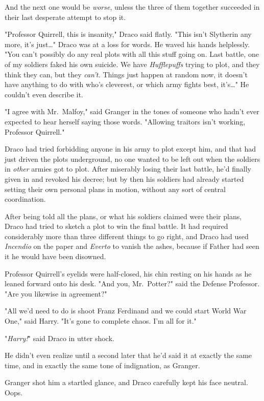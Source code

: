 And the next one would be \emph{worse}, unless the three of them together
succeeded in their last desperate attempt to stop it.

"Professor Quirrell, this is insanity," Draco said flatly. "This isn't
Slytherin any more, it's just{\ldots}" Draco was at a loss for words. He
waved his hands helplessly. "You can't possibly do any real plots with all this
stuff going on. Last battle, one of my soldiers faked his own suicide. We have
\emph{Hufflepuffs} trying to plot, and they think they can, but they
\emph{can't.} Things just happen at random now, it doesn't have anything to do
with who's cleverest, or which army fights best, it's{\ldots}" He couldn't even
describe it.

"I agree with Mr.~Malfoy," said Granger in the tones of someone who hadn't ever
expected to hear herself saying those words. "Allowing traitors isn't working,
Professor Quirrell."

Draco had tried forbidding anyone in his army to plot except him, and that had
just driven the plots underground, no one wanted to be left out when the
soldiers in \emph{other} armies got to plot. After miserably losing their last
battle, he'd finally given in and revoked his decree; but by then his soldiers
had already started setting their own personal plans in motion, without any
sort of central coordination.

After being told all the plans, or what his soldiers claimed were their plans,
Draco had tried to sketch a plot to win the final battle. It had required
considerably more than three different things to go right, and Draco had used
\emph{Incendio} on the paper and \emph{Everto} to vanish the ashes, because if
Father had seen it he would have been disowned.

Professor Quirrell's eyelids were half-closed, his chin resting on his hands as
he leaned forward onto his desk. "And you, Mr.~Potter?" said the Defense
Professor. "Are you likewise in agreement?"

"All we'd need to do is shoot Franz Ferdinand and we could start World War
One," said Harry. "It's gone to complete chaos. I'm all for it."

"\emph{Harry!}" said Draco in utter shock.

He didn't even realize until a second later that he'd said it at exactly the
same time, and in exactly the same tone of indignation, as Granger.

Granger shot him a startled glance, and Draco carefully kept his face neutral.
Oops.

